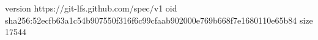 version https://git-lfs.github.com/spec/v1
oid sha256:52ecfb63a1c54b907550f316f6c99cfaab902000e769b668f7e1680110e65b84
size 17544
